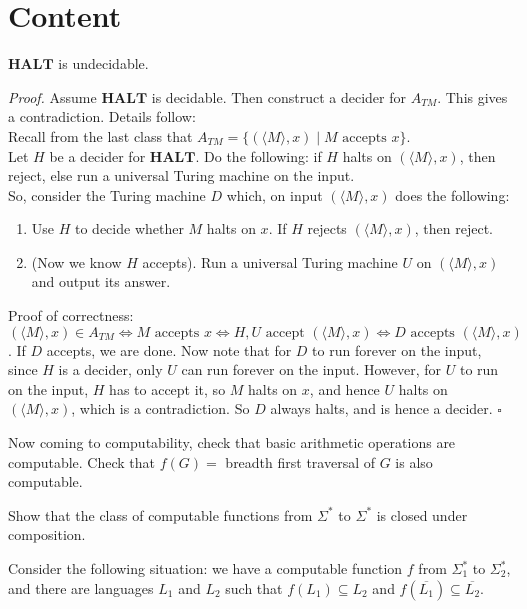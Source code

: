 \documentclass[a4paper]{article}
\newenvironment{proof}{\begin{breakbox}\textit{Proof.}}{\hfill$\square$\end{breakbox}}
\newcommand{\nl}{\vspace{0.2cm}\\}
\newcommand{\mf}{\mathbf}
\newcommand{\comp}{\overline}
\begin{document}
\section{Content}

\begin{theorem}
    $\mf{HALT}$ is undecidable.
\end{theorem}
\begin{proof}
    Assume $\mf{HALT}$ is decidable. Then construct a decider for $A_{TM}$. This gives a contradiction. Details follow:\nl
    Recall from the last class that $A_{TM} = \{(\langle M \rangle, x) \mid M \text{ accepts } x\}$.\nl
    Let $H$ be a decider for $\mf{HALT}$. Do the following: if $H$ halts on $(\langle M \rangle, x)$, then reject, else run a universal Turing machine on the input.\nl
    So, consider the Turing machine $D$ which, on input $(\langle M \rangle, x)$ does the following:
    \begin{enumerate}
        \item Use $H$ to decide whether $M$ halts on $x$. If $H$ rejects $(\langle M \rangle, x)$, then reject.
        \item (Now we know $H$ accepts). Run a universal Turing machine $U$ on $(\langle M \rangle, x)$ and output its answer.
    \end{enumerate}
    Proof of correctness:\nl
    $(\langle M \rangle, x) \in A_{TM} \iff M \text{ accepts } x \iff H, U \text{ accept } (\langle M \rangle, x) \iff D \text{ accepts } (\langle M \rangle, x)$.
    If $D$ accepts, we are done. Now note that for $D$ to run forever on the input, since $H$ is a decider, only $U$ can run forever on the input. However, for $U$ to run on the input, $H$ has to
    accept it, so $M$ halts on $x$, and hence $U$ halts on $(\langle M \rangle, x)$, which is a contradiction. So $D$ always halts, and is hence a decider.
\end{proof}

Now coming to computability, check that basic arithmetic operations are computable. Check that $f(G) = $ breadth first traversal of $G$ is also computable.\nl

\begin{ques}
    Show that the class of computable functions from $\Sigma^*$ to $\Sigma^*$ is closed under composition.
\end{ques}

Consider the following situation: we have a computable function $f$ from $\Sigma_1^*$ to $\Sigma_2^*$, and there are languages $L_1$ and $L_2$ such that $f(L_1) \subseteq L_2$ and $f(\comp{L_1}) \subseteq
\comp{L_2}$.\nl
\end{document}
